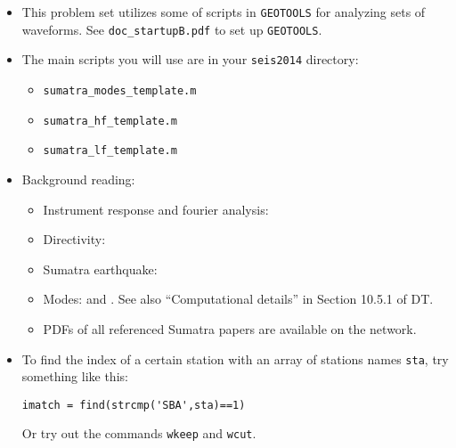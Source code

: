\documentclass[11pt,titlepage,fleqn]{article}
\begin{document}
\begin{itemize}
\item This problem set utilizes some of scripts in \verb+GEOTOOLS+ for analyzing sets of waveforms. See \verb+doc_startupB.pdf+ to set up \verb+GEOTOOLS+.


\item The main scripts you will use are in your \verb+seis2014+ directory:
%
\begin{itemize}
\item \verb+sumatra_modes_template.m+
\item \verb+sumatra_hf_template.m+
\item \verb+sumatra_lf_template.m+
\end{itemize}


\item Background reading:

\begin{itemize}
\item Instrument response and fourier analysis: \citet[][Ch.~6]{SteinWysession}
\item Directivity: \citet[][Section 4.3.2]{SteinWysession} 
\item Sumatra earthquake: \citep{Lay2005,Ammon2005,Park2005,Ni2005,SSteinOkal2007}
\item Modes: \citet[][Section 2.9]{SteinWysession} and \citet[][Ch.~8]{DT}. See also ``Computational details'' in Section 10.5.1 of DT.
\item PDFs of all referenced Sumatra papers are available on the network.


\end{itemize}


\item To find the index of a certain station with an array of stations names \verb+sta+, try something like this:
%
\begin{verbatim}
imatch = find(strcmp('SBA',sta)==1)
\end{verbatim}
%
Or try out the commands \verb+wkeep+ and \verb+wcut+.




\end{itemize}
\end{document}
